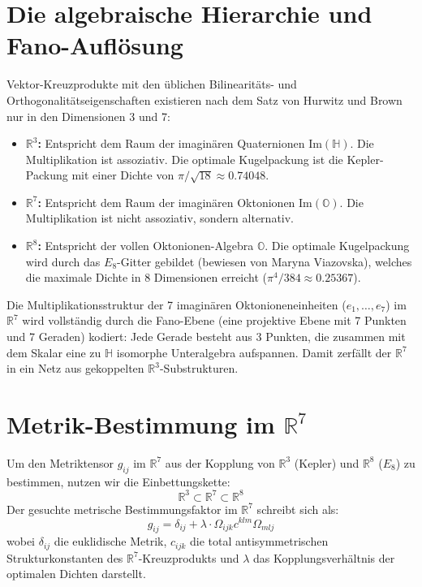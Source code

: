 \documentclass[11pt,a4paper]{article}
\begin{document}
\section{Die algebraische Hierarchie und Fano-Auflösung}
Vektor-Kreuzprodukte mit den üblichen Bilinearitäts- und Orthogonalitätseigenschaften existieren nach dem Satz von Hurwitz und Brown nur in den Dimensionen 3 und 7:
\begin{itemize}
    \item \textbf{$\mathbb{R}^3$:} Entspricht dem Raum der imaginären Quaternionen $\text{Im}(\mathbb{H})$. Die Multiplikation ist assoziativ. Die optimale Kugelpackung ist die Kepler-Packung mit einer Dichte von $\pi / \sqrt{18} \approx 0.74048$.
    \item \textbf{$\mathbb{R}^7$:} Entspricht dem Raum der imaginären Oktonionen $\text{Im}(\mathbb{O})$. Die Multiplikation ist nicht assoziativ, sondern alternativ.
    \item \textbf{$\mathbb{R}^8$:} Entspricht der vollen Oktonionen-Algebra $\mathbb{O}$. Die optimale Kugelpackung wird durch das $E_8$-Gitter gebildet (bewiesen von Maryna Viazovska), welches die maximale Dichte in 8 Dimensionen erreicht ($\pi^4 / 384 \approx 0.25367$).
\end{itemize}

Die Multiplikationsstruktur der 7 imaginären Oktonioneneinheiten ($e_1, \dots, e_7$) im $\mathbb{R}^7$ wird vollständig durch die Fano-Ebene (eine projektive Ebene mit 7 Punkten und 7 Geraden) kodiert: Jede Gerade besteht aus 3 Punkten, die zusammen mit dem Skalar eine zu $\mathbb{H}$ isomorphe Unteralgebra aufspannen. Damit zerfällt der $\mathbb{R}^7$ in ein Netz aus gekoppelten $\mathbb{R}^3$-Substrukturen.

\section{Metrik-Bestimmung im $\mathbb{R}^7$}
Um den Metriktensor $g_{ij}$ im $\mathbb{R}^7$ aus der Kopplung von $\mathbb{R}^3$ (Kepler) und $\mathbb{R}^8$ ($E_8$) zu bestimmen, nutzen wir die Einbettungskette:
$$\mathbb{R}^3 \subset \mathbb{R}^7 \subset \mathbb{R}^8$$
Der gesuchte metrische Bestimmungsfaktor im $\mathbb{R}^7$ schreibt sich als:
$$g_{ij} = \delta_{ij} + \lambda \cdot \Omega_{ijk} c^{klm} \Omega_{mlj}$$
wobei $\delta_{ij}$ die euklidische Metrik, $c_{ijk}$ die total antisymmetrischen Strukturkonstanten des $\mathbb{R}^7$-Kreuzprodukts und $\lambda$ das Kopplungsverhältnis der optimalen Dichten darstellt.
\end{document}

